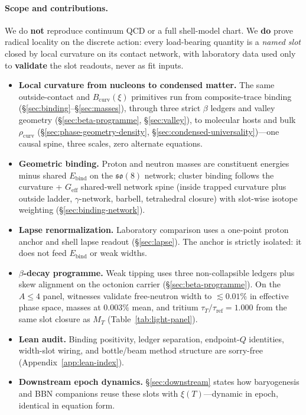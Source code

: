 \documentclass[11pt,notitlepage]{amsart}
\begin{document}
\paragraph{Scope and contributions.}
We do \textbf{not} reproduce continuum QCD or a full shell-model chart. We \textbf{do}
prove radical locality on the discrete action: every load-bearing quantity is a
\emph{named slot} closed by local curvature on its contact network, with laboratory
data used only to \textbf{validate} the slot readouts, never as fit inputs.
\begin{itemize}[leftmargin=2em]
\item \textbf{Local curvature from nucleons to condensed matter.} The same outside-contact and
  $B_{\mathrm{curv}}(\xi)$ primitives run from composite-trace binding
  (\S\ref{sec:binding}--\S\ref{sec:masses}), through three strict $\beta$ ledgers and
  valley geometry (\S\ref{sec:beta-programme}, \S\ref{sec:valley}), to molecular hosts
  and bulk $\rho_{\mathrm{curv}}$ (\S\ref{sec:phase-geometry-density},
  \S\ref{sec:condensed-universality})---one causal
  spine, three scales, zero alternate equations.
\item \textbf{Geometric binding.} Proton and neutron masses are constituent energies
  minus shared $E_{\mathrm{bind}}$ on the $\mathfrak{so}(8)$ network; cluster binding
  follows the curvature + $G_{\mathrm{eff}}$ shared-well network spine (inside trapped
  curvature plus outside ladder, $\gamma$-network, barbell, tetrahedral closure) with
  slot-wise isotope weighting (\S\ref{sec:binding-network}).
\item \textbf{Lapse renormalization.} Laboratory comparison uses a one-point proton
  anchor and shell lapse readout (\S\ref{sec:lapse}). The anchor is strictly isolated:
  it does not feed $E_{\mathrm{bind}}$ or weak widths.
\item \textbf{$\beta$-decay programme.} Weak tipping uses three non-collapsible ledgers
  plus skew alignment on the octonion carrier (\S\ref{sec:beta-programme}). On the
  $A\le 4$ panel, witnesses validate free-neutron width to $\lesssim 0.01\%$ in
  effective phase space, masses at $0.003\%$ mean, and tritium
  $\tau_T/\tau_{\mathrm{ref}}=1.000$ from the same slot closure as $M_T$
  (Table~\ref{tab:light-panel}).
\item \textbf{Lean audit.} Binding positivity, ledger separation, endpoint-$Q$
  identities, width-slot wiring, and bottle/beam method structure are sorry-free
  (Appendix~\ref{app:lean-index}).
\item \textbf{Downstream epoch dynamics.} \S\ref{sec:downstream} states how baryogenesis
  and BBN companions reuse these slots with $\xi(T)$---dynamic in epoch, identical in
  equation form.
\end{itemize}
\end{document}

